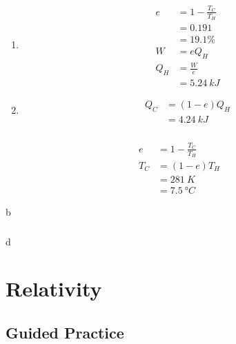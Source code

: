\documentclass{article}
\begin{document}
\begin{enumerate}
  \item

        \begin{align*}
          e   & = 1 - \frac{T_C}{T_H} \\
              & = 0.191               \\
              & = 19.1\%              \\
          W   & = e Q_H               \\
          Q_H & = \frac{W}{e}         \\
              & = \qty{5.24}{kJ}
        \end{align*}

  \item

        \begin{align*}
          Q_C & = (1 - e) Q_H    \\
              & = \qty{4.24}{kJ}
        \end{align*}
\end{enumerate}

\setcounter{subsubsection}{58}
\subsubsection{}

\begin{align*}
  e   & = 1 - \frac{T_C}{T_H}  \\
  T_C & = (1 - e) T_H          \\
      & = \qty{281}{K}         \\
      & = \qty{7.5}{\degree C}
\end{align*}

b

\setcounter{subsubsection}{60}
\subsubsection{}

d

\section{Relativity}

\subsection{Guided Practice}

\subsubsection{}
\end{document}
